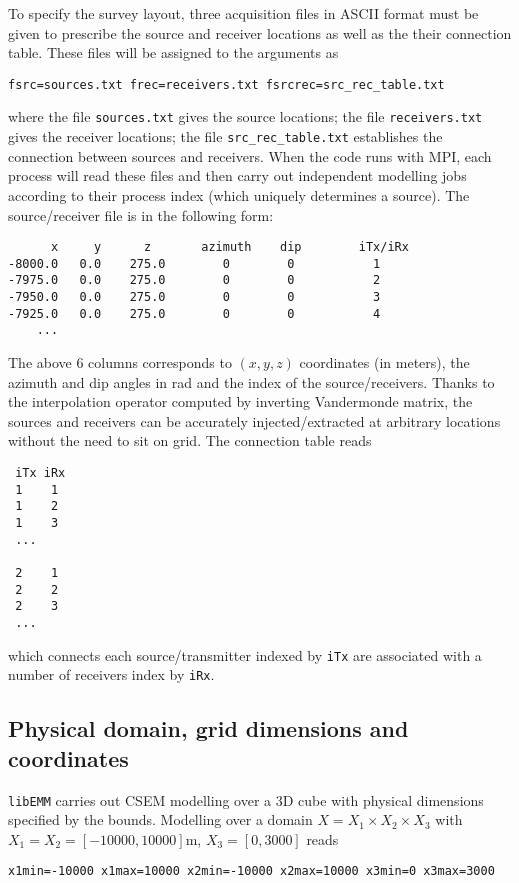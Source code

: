 \documentclass[a4paper,10pt]{article}
\begin{document}
To specify the survey layout, three acquisition files in ASCII format must be given to prescribe the source and receiver locations as well as the their connection table. These files will be assigned to the arguments as
\begin{verbatim}
fsrc=sources.txt frec=receivers.txt fsrcrec=src_rec_table.txt
\end{verbatim}
where the file \verb|sources.txt| gives the source locations; the file \verb|receivers.txt| gives the receiver locations; the file \verb|src_rec_table.txt| establishes the connection between sources and receivers. When the code runs with MPI, each process will read these files and then carry out independent modelling jobs according to their process index (which uniquely determines a source). The source/receiver file is in the following form:
\begin{verbatim}
      x     y      z       azimuth    dip        iTx/iRx
-8000.0   0.0    275.0        0        0           1
-7975.0   0.0    275.0        0        0           2
-7950.0   0.0    275.0        0        0           3
-7925.0   0.0    275.0        0        0           4
    ...
\end{verbatim}
The above 6 columns corresponds to $(x,y,z)$ coordinates (in meters), the azimuth and dip angles in rad and the index of the source/receivers. Thanks to the interpolation operator computed by inverting Vandermonde matrix, the sources and receivers can be accurately injected/extracted at arbitrary locations without the need to sit on grid. The connection table reads
\begin{verbatim}
 iTx iRx
 1    1
 1    2
 1    3
 ...
 
 2    1
 2    2
 2    3
 ...
\end{verbatim}
which connects each source/transmitter indexed by \verb|iTx| are associated with a number of receivers index by \verb|iRx|.


\subsection{Physical domain,  grid dimensions and coordinates}

\verb|libEMM| carries out CSEM modelling over a 3D cube with physical dimensions specified by the bounds. Modelling over a domain $X=X_1\times X_2\times X_3$ with $X_1=X_2=[-10000,10000]$m, $X_3=[0,3000]$ reads
\begin{verbatim}
x1min=-10000 x1max=10000 x2min=-10000 x2max=10000 x3min=0 x3max=3000
\end{verbatim}
\end{document}
